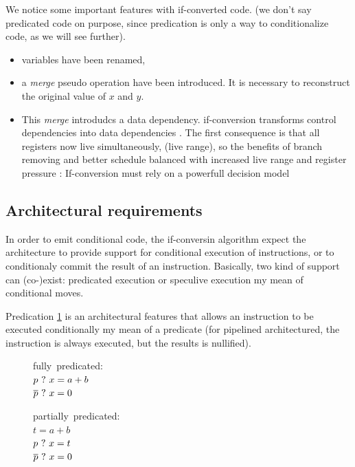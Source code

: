 We notice some important features with if-converted code. (we don't say predicated code on purpose, since predication is only a way to conditionalize code, as we will see further).

\begin{itemize}
\item variables have been renamed, 
\item a \textit{merge} pseudo operation have been introduced. It is necessary to reconstruct the original value of $x$ and $y$.
\item This \textit{merge} introdudcs a data dependency. if-conversion transforms control dependencies into data dependencies \cite{Allen:1983:CCD:567067.567085}. The first consequence is that all registers now live simultaneously, (live range), so the benefits of branch removing and better schedule balanced with increased live range and register pressure : If-conversion must rely on a powerfull decision model
\end{itemize}

\subsection{Architectural requirements}
In order to emit conditional code, the if-conversin algorithm expect the architecture to provide support for conditional execution of instructions, or to conditionaly commit the result of an instruction.
Basically, two kind of support can (co-)exist: predicated execution or speculive execution my mean of conditional moves.

Predication \ref{fig:pred} is an architectural features that allows an instruction to be executed conditionally my mean of a predicate (for pipelined architectured, the instruction is always executed, but the results is nullified). 

\begin{figure}
\begin{minipage}[t]{4cm}
\mbox{fully predicated:} \\
$ p ~?~ x = a + b $ \\
$ \overline{p} ~?~ x = 0 $ \\
\end{minipage}
\begin{minipage}[t]{4cm}
\mbox{partially predicated:} \\
$t = a + b $ \\
$p ~?~ x = t $ \\
$\overline{p} ~?~ x = 0 $ \\
\end{minipage}
\label{fig:pred}
\end{figure}

